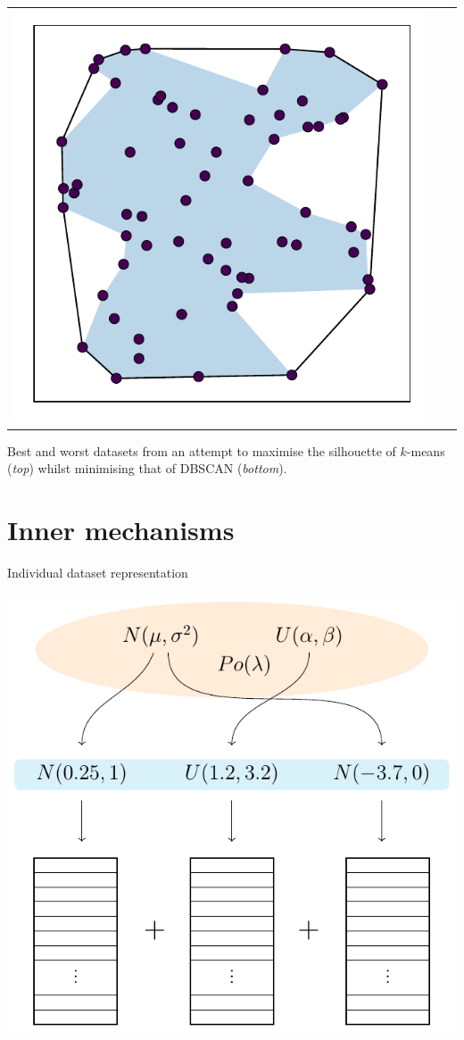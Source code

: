\documentclass[a0paper]{betterposter}
\begin{document}
{\begin{center}
\begin{minipage}{.8\linewidth}
\begin{tabular}{ccc}
            \includegraphics[width=.45\linewidth]{img/dbscan_worst.pdf}
        \end{tabular}
    \end{minipage}
\end{center}

{\fontsize{26}{24}\selectfont\textcolor{mygrey}{%
    Best and worst datasets from an attempt to maximise the silhouette of
    \(k\)-means (\textit{top}) whilst minimising that of DBSCAN
    (\textit{bottom}).
}}

}{%


\vspace{-3em}\section{Inner mechanisms}
\fontsize{40}{50}\selectfont
Individual dataset representation

\vspace{.75ex}\begin{center}
    \includegraphics[width=.65\linewidth]{tex/individual.pdf}
\end{center}

}
\end{document}
